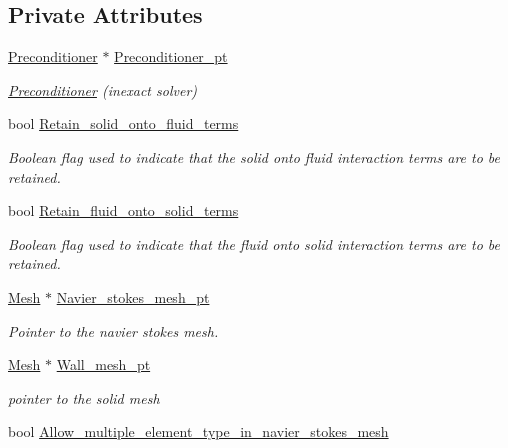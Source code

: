 \subsection*{Private Attributes}
\begin{DoxyCompactItemize}
\item 
\hyperlink{classoomph_1_1Preconditioner}{Preconditioner} $\ast$ \hyperlink{classoomph_1_1SimpleFSIPreconditioner_aa08cfa51beb62ce3d72f47b8e75ce9f3}{Preconditioner\+\_\+pt}
\begin{DoxyCompactList}\small\item\em \hyperlink{classoomph_1_1Preconditioner}{Preconditioner} (inexact solver) \end{DoxyCompactList}\item 
bool \hyperlink{classoomph_1_1SimpleFSIPreconditioner_a62e9e620ecb6022d20aa09b493f6950d}{Retain\+\_\+solid\+\_\+onto\+\_\+fluid\+\_\+terms}
\begin{DoxyCompactList}\small\item\em Boolean flag used to indicate that the solid onto fluid interaction terms are to be retained. \end{DoxyCompactList}\item 
bool \hyperlink{classoomph_1_1SimpleFSIPreconditioner_a0bc8bfc84237a096d6687d902edcf33b}{Retain\+\_\+fluid\+\_\+onto\+\_\+solid\+\_\+terms}
\begin{DoxyCompactList}\small\item\em Boolean flag used to indicate that the fluid onto solid interaction terms are to be retained. \end{DoxyCompactList}\item 
\hyperlink{classoomph_1_1Mesh}{Mesh} $\ast$ \hyperlink{classoomph_1_1SimpleFSIPreconditioner_a957b57dc5d05df008c15aec8f3c2ea0f}{Navier\+\_\+stokes\+\_\+mesh\+\_\+pt}
\begin{DoxyCompactList}\small\item\em Pointer to the navier stokes mesh. \end{DoxyCompactList}\item 
\hyperlink{classoomph_1_1Mesh}{Mesh} $\ast$ \hyperlink{classoomph_1_1SimpleFSIPreconditioner_a3ad28ce867dc02b67f674ff8e159bff8}{Wall\+\_\+mesh\+\_\+pt}
\begin{DoxyCompactList}\small\item\em pointer to the solid mesh \end{DoxyCompactList}\item 
bool \hyperlink{classoomph_1_1SimpleFSIPreconditioner_a9e1ceded449890704546b3f281bedecb}{Allow\+\_\+multiple\+\_\+element\+\_\+type\+\_\+in\+\_\+navier\+\_\+stokes\+\_\+mesh}

\end{DoxyCompactItemize}
